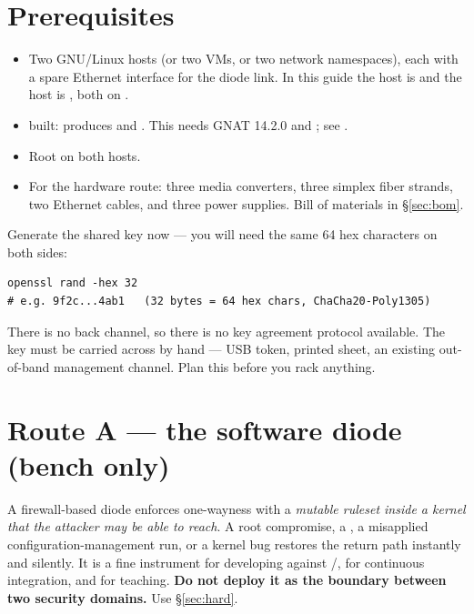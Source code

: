 \documentclass[11pt,a4paper]{article}
\renewcommand{\amp}{\prog{ld\_amp}}
\renewcommand{\deamp}{\prog{ld\_deamp}}
\begin{document}
\section{Prerequisites}

\begin{itemize}
\item Two GNU/Linux hosts (or two VMs, or two network namespaces), each with a
      spare Ethernet interface for the diode link. In this guide the
      \srcside{} host is  and the \dstside{} host is
      , both on .
\item {} built:  produces
       and . This needs GNAT 14.2.0 and
      ; see .
\item Root on both hosts.
\item For the hardware route: three media converters, three simplex fiber
      strands, two Ethernet cables, and three power supplies. Bill of
      materials in \S\ref{sec:bom}.
\end{itemize}

Generate the shared key now --- you will need the same 64 hex characters on
both sides:

\begin{lstlisting}[style=shell]
openssl rand -hex 32
# e.g. 9f2c...4ab1   (32 bytes = 64 hex chars, ChaCha20-Poly1305)
\end{lstlisting}

\begin{warnbox}
There is no back channel, so there is no key agreement protocol available.
The key must be carried across by hand --- USB token, printed sheet, an
existing out-of-band management channel. Plan this before you rack anything.
\end{warnbox}

\section{Route A --- the software diode (bench only)}
\label{sec:soft}

\begin{labbox}
A firewall-based diode enforces one-wayness with a \emph{mutable ruleset
inside a kernel that the attacker may be able to reach}. A root compromise,
a , a misapplied configuration-management run, or a
kernel bug restores the return path instantly and silently. It is a fine
instrument for developing against \amp{}/\deamp{}, for continuous
integration, and for teaching. \textbf{Do not deploy it as the boundary
between two security domains.} Use \S\ref{sec:hard}.
\end{labbox}
\end{document}
